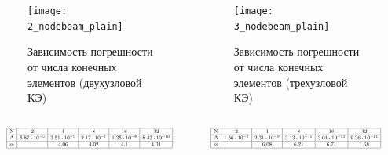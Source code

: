 \documentclass[7pt]{beamer}
\numberwithin{equation}{section}
\newcommand*{\Scale}[2][4]{\scalebox{#1}{$#2$}}
\begin{document}
\begin{frame}{}
	\begin{columns}
		\begin{column}{0.57\textwidth}
			\begin{figure}[H]
				\centering
				\texttt{[image: 2\_nodebeam\_plain]}
				\caption{Зависимость погрешности от числа конечных элементов (двухузловой КЭ)}
				\label{2_nodebeam_plain}
			\end{figure}
		\end{column}
		\begin{column}{0.57\textwidth}
			\begin{figure}[H]
				\centering
				\texttt{[image: 3\_nodebeam\_plain]}
				\caption{Зависимость погрешности от числа конечных элементов (трехузловой КЭ)}
				\label{3_nodebeam_plain}
			\end{figure}
		\end{column}
	\end{columns}
	\begin{columns}
		\begin{column}{0.5\textwidth}
			\[
				\Scale[0.5] {
					\begin{array}{|c|c|c|c|c|c|}
							\hline
							\text{N} & 2 & 4 & 8 & 16 & 32 \\ \hline
							\Delta  & 5.87 \cdot 10^{-5}  & 3.51 \cdot 10^{-9} & 2.17 \cdot 10^{-7} & 1.35 \cdot 10^{-8} & 8.43 \cdot 10^{-10}\\ \hline
							m &  & 4.06 & 4.02 & 4.1 & 4.01 \\ 
							\hline
					\end{array}
				}
			\]
		\end{column}
		\begin{column}{0.5\textwidth}
			\[
				\Scale[0.5] {
					\begin{array}{|c|c|c|c|c|c|}
							\hline
							\text{N} & 2 & 4 & 8 & 16 & 32 \\ \hline
							\Delta  & 1.56 \cdot 10^{-7} & 2.31 \cdot 10^{-9} & 3.13 \cdot 10^{-11} & 3.01 \cdot 10^{-13} & 9.36 \cdot 10^{-14} \\ \hline
							m &  & 6.08 & 6.21 & 6.71 & 1.68 \\ 
							\hline
					\end{array}
				}
			\]
		\end{column}
	\end{columns}
\end{frame}
\end{document}
